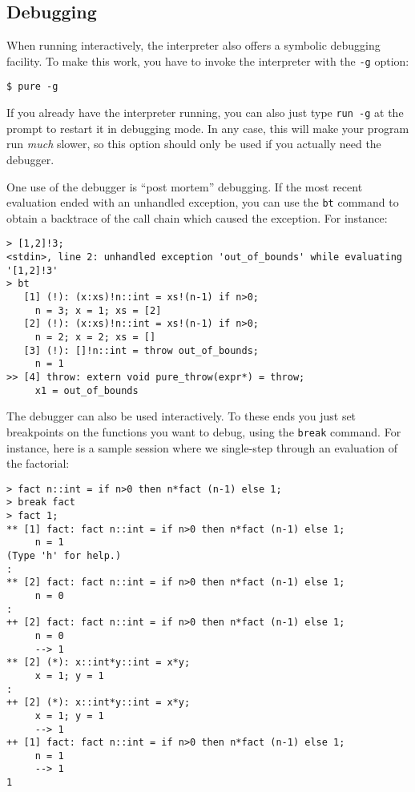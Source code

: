 \documentclass[a4paper,12pt]{article}
\begin{document}
\subsection{Debugging}
\label{Debugging}

When running interactively, the interpreter also offers a symbolic debugging facility. To make this work, you have to invoke the interpreter with the \verb|-g| option:

\begin{verbatim}
$ pure -g
\end{verbatim}

If you already have the interpreter running, you can also just type \lstinline{run -g} at the prompt to restart it in debugging mode. In any case, this will make your program run \emph{much} slower, so this option should only be used if you actually need the debugger.

One use of the debugger is ``post mortem'' debugging. If the most recent evaluation ended with an unhandled exception, you can use the \verb|bt| command to obtain a backtrace of the call chain which caused the exception. For instance:

\begin{lstlisting}
> [1,2]!3;
<stdin>, line 2: unhandled exception 'out_of_bounds' while evaluating
'[1,2]!3'
> bt
   [1] (!): (x:xs)!n::int = xs!(n-1) if n>0;
     n = 3; x = 1; xs = [2]
   [2] (!): (x:xs)!n::int = xs!(n-1) if n>0;
     n = 2; x = 2; xs = []
   [3] (!): []!n::int = throw out_of_bounds;
     n = 1
>> [4] throw: extern void pure_throw(expr*) = throw;
     x1 = out_of_bounds
\end{lstlisting}

The debugger can also be used interactively. To these ends you just set breakpoints on the functions you want to debug, using the \verb|break| command. For instance, here is a sample session where we single-step through an evaluation of the factorial:

\begin{lstlisting}
> fact n::int = if n>0 then n*fact (n-1) else 1;
> break fact
> fact 1;
** [1] fact: fact n::int = if n>0 then n*fact (n-1) else 1;
     n = 1
(Type 'h' for help.)
:
** [2] fact: fact n::int = if n>0 then n*fact (n-1) else 1;
     n = 0
:
++ [2] fact: fact n::int = if n>0 then n*fact (n-1) else 1;
     n = 0
     --> 1
** [2] (*): x::int*y::int = x*y;
     x = 1; y = 1
:
++ [2] (*): x::int*y::int = x*y;
     x = 1; y = 1
     --> 1
++ [1] fact: fact n::int = if n>0 then n*fact (n-1) else 1;
     n = 1
     --> 1
1
\end{lstlisting}
\end{document}
